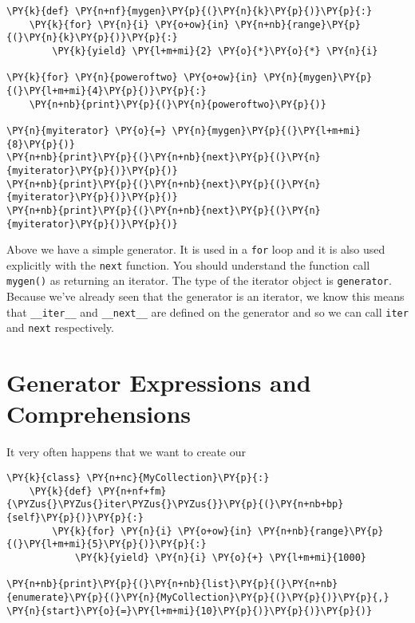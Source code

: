 \begin{Verbatim}[commandchars=\\\{\}]
\PY{k}{def} \PY{n+nf}{mygen}\PY{p}{(}\PY{n}{k}\PY{p}{)}\PY{p}{:}
    \PY{k}{for} \PY{n}{i} \PY{o+ow}{in} \PY{n+nb}{range}\PY{p}{(}\PY{n}{k}\PY{p}{)}\PY{p}{:}
        \PY{k}{yield} \PY{l+m+mi}{2} \PY{o}{*}\PY{o}{*} \PY{n}{i}

\PY{k}{for} \PY{n}{poweroftwo} \PY{o+ow}{in} \PY{n}{mygen}\PY{p}{(}\PY{l+m+mi}{4}\PY{p}{)}\PY{p}{:}
    \PY{n+nb}{print}\PY{p}{(}\PY{n}{poweroftwo}\PY{p}{)}

\PY{n}{myiterator} \PY{o}{=} \PY{n}{mygen}\PY{p}{(}\PY{l+m+mi}{8}\PY{p}{)}
\PY{n+nb}{print}\PY{p}{(}\PY{n+nb}{next}\PY{p}{(}\PY{n}{myiterator}\PY{p}{)}\PY{p}{)}
\PY{n+nb}{print}\PY{p}{(}\PY{n+nb}{next}\PY{p}{(}\PY{n}{myiterator}\PY{p}{)}\PY{p}{)}
\PY{n+nb}{print}\PY{p}{(}\PY{n+nb}{next}\PY{p}{(}\PY{n}{myiterator}\PY{p}{)}\PY{p}{)}
\end{Verbatim}



Above we have a simple generator.  It is used in a \texttt{for} loop and it is also used explicitly with the \texttt{next} function.  You should understand the function call \texttt{mygen()} as returning an iterator.  The type of the iterator object is \texttt{generator}.  Because we’ve already seen that the generator is an iterator, we know this means that \texttt{\_\_iter\_\_} and \texttt{\_\_next\_\_} are defined on the generator and so we can call \texttt{iter} and \texttt{next} respectively.

\section{Generator Expressions and Comprehensions}


It very often happens that we want to create our

\begin{Verbatim}[commandchars=\\\{\}]
\PY{k}{class} \PY{n+nc}{MyCollection}\PY{p}{:}
    \PY{k}{def} \PY{n+nf+fm}{\PYZus{}\PYZus{}iter\PYZus{}\PYZus{}}\PY{p}{(}\PY{n+nb+bp}{self}\PY{p}{)}\PY{p}{:}
        \PY{k}{for} \PY{n}{i} \PY{o+ow}{in} \PY{n+nb}{range}\PY{p}{(}\PY{l+m+mi}{5}\PY{p}{)}\PY{p}{:}
            \PY{k}{yield} \PY{n}{i} \PY{o}{+} \PY{l+m+mi}{1000}

\PY{n+nb}{print}\PY{p}{(}\PY{n+nb}{list}\PY{p}{(}\PY{n+nb}{enumerate}\PY{p}{(}\PY{n}{MyCollection}\PY{p}{(}\PY{p}{)}\PY{p}{,} \PY{n}{start}\PY{o}{=}\PY{l+m+mi}{10}\PY{p}{)}\PY{p}{)}\PY{p}{)}
\end{Verbatim}


